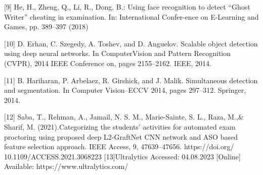 \documentclass[conference]{IEEEtran}
\begin{document}
 [9]   He, H., Zheng, Q., Li, R., Dong, B.: Using face recognition to detect
    “Ghost Writer” cheating in examination. In: International Confer-ence on
    E-Learning and Games, pp. 389–397 (2018)

[10] D. Erhan, C. Szegedy, A. Toshev, and D. Anguelov. Scalable
     object detection using deep neural networks. In ComputerVision and Pattern Recognition (CVPR), 2014 IEEE Conference on, pages 2155–2162. IEEE, 2014.

[11] B. Hariharan, P. Arbelaez, R. Girshick, and J. Malik. Simultaneous               detection and segmentation. In Computer Vision–ECCV 2014, pages 297–312.         Springer, 2014.     

[12] Saba, T., Rehman, A., Jamail, N. S. M., Marie-Sainte, S. L., Raza, M.,\&         Sharif, M. (2021).Categorizing the students’ activities for automated exam       proctoring using proposed deep L2-GraftNet CNN network and ASO based             feature selection approach. IEEE Access, 9, 47639–47656. https://doi.org/        10.1109/ACCESS.2021.3068223
[13]Ultralytics Accessed: 04.08.2023 [Online]
    Available: https://www.ultralytics.com/
\end{document}
